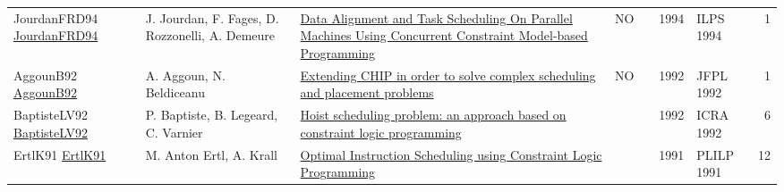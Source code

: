 {\begin{longtable}{p{3cm}p{6cm}p{7cm}rrrp{3cm}r}
JourdanFRD94 \href{}{JourdanFRD94} & J. Jourdan, F. Fages, D. Rozzonelli, A. Demeure & \href{papers/JourdanFRD94.pdf}{Data Alignment and Task Scheduling On Parallel Machines Using Concurrent Constraint Model-based Programming} & NO & \cite{JourdanFRD94} & 1994 & ILPS 1994 & 1\\
AggounB92 \href{}{AggounB92} & A. Aggoun, N. Beldiceanu & \href{papers/AggounB92.pdf}{Extending {CHIP} in order to solve complex scheduling and placement problems} & NO & \cite{AggounB92} & 1992 & JFPL 1992 & 1\\
BaptisteLV92 \href{https://doi.org/10.1109/ROBOT.1992.220195}{BaptisteLV92} & P. Baptiste, B. Legeard, C. Varnier & \href{papers/BaptisteLV92.pdf}{Hoist scheduling problem: an approach based on constraint logic programming} &  & \cite{BaptisteLV92} & 1992 & ICRA 1992 & 6\\
ErtlK91 \href{https://doi.org/10.1007/3-540-54444-5\_89}{ErtlK91} & M. Anton Ertl, A. Krall & \href{papers/ErtlK91.pdf}{Optimal Instruction Scheduling using Constraint Logic Programming} &  & \cite{ErtlK91} & 1991 & PLILP 1991 & 12\\
\end{longtable}
}

